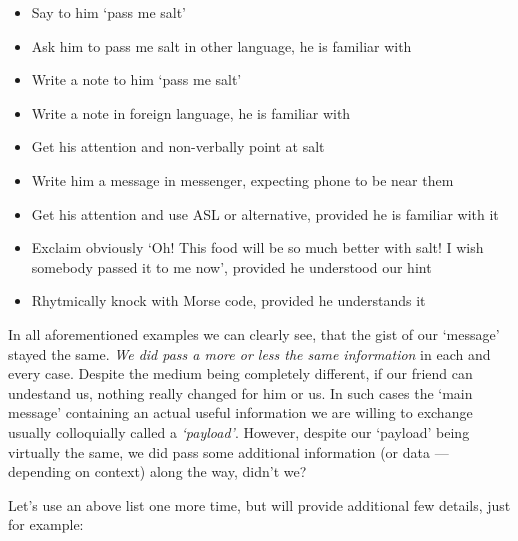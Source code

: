 \documentclass[../../what-is-computer.tex]{subfiles}
\begin{document}
    \begin{itemize}
        \item Say to him `pass me salt'
        \item Ask him to pass me salt in other language, he is familiar with
        \item Write a note to him `pass me salt'
        \item Write a note in foreign language, he is familiar with
        \item Get his attention and non-verbally point at salt
        \item Write him a message in messenger, expecting phone to be near them
        \item Get his attention and use ASL or alternative, provided he is familiar with it
        \item Exclaim obviously `Oh! This food will be so much better with salt! I wish somebody passed it to me now', provided he understood our hint
        \item Rhytmically knock with Morse code, provided he understands it
    \end{itemize}

    In all aforementioned examples we can clearly see, that the gist of our `message' stayed the same. \emph{We did pass a more or less the same information} in 
    each and every case. Despite the medium being completely different, if our friend can undestand us, nothing really changed for him or us. In such cases
    the `main message' containing an actual useful information we are willing to exchange usually colloquially called a \emph{`payload'}. However,
    despite our `payload' being virtually the same, we did pass some additional information (or data --- depending on context) along the way, didn't we?

    Let's use an above list one more time, but will provide additional few details, just for example:
\end{document}
